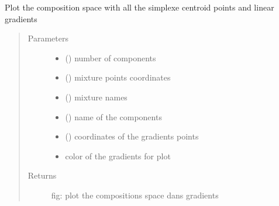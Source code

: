 \documentclass[letterpaper,10pt,english]{sphinxmanual}
\begin{document}
\label{\detokenize{ExperimentsPlannification:module-modules}}

\begin{fulllineitems}
\label{\detokenize{ExperimentsPlannification:modules.plot_compo_space_gradients}}
\sphinxAtStartPar
Plot the composition space with all the simplexe centroid points and linear gradients
\begin{quote}\begin{description}
\item[{Parameters}] \leavevmode\begin{itemize}
\item {} 
\sphinxAtStartPar
{} () \textendash{} number of components

\item {} 
\sphinxAtStartPar
{} () \textendash{} mixture points coordinates

\item {} 
\sphinxAtStartPar
{} () \textendash{} mixture names

\item {} 
\sphinxAtStartPar
{} () \textendash{} name of the components

\item {} 
\sphinxAtStartPar
{} () \textendash{} coordinates of the gradients points

\item {} 
\sphinxAtStartPar
{} \textendash{} color of the gradients for plot

\end{itemize}

\item[{Returns}] \leavevmode
\sphinxAtStartPar
fig: plot the compositions space dans gradients

\end{description}\end{quote}

\end{fulllineitems}
\end{document}
